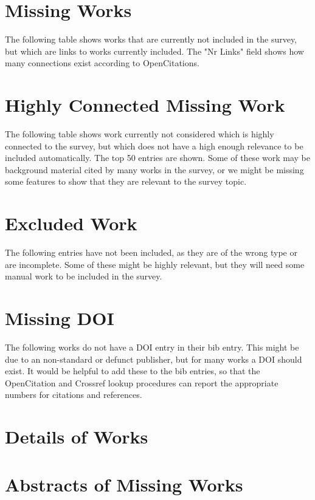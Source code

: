 \documentclass[a4paper]{article}
\begin{document}




\clearpage
\section{Missing Works}

The following table shows works that are currently not included in the survey, but which are links to works currently included. The "Nr Links" field shows how many connections exist according to OpenCitations.



\clearpage
\section{Highly Connected Missing Work}

The following table shows work currently not considered which is highly connected to the survey, but which does not have a high enough relevance to be included automatically. The top 50 entries are shown. Some of these work may be background material cited by many works in the survey, or we might be missing some features to show that they are relevant to the survey topic.



\clearpage
\section{Excluded Work}

The following entries have not been included, as they are of the wrong type or are incomplete. Some of these might be highly relevant, but they will need some manual work to be included in the survey.



\clearpage
\section{Missing DOI}

The following works do not have a DOI entry in their bib entry. This might be due to an non-standard or defunct publisher, but for many works a DOI should exist. It would be helpful to add these to the bib entries, so that the OpenCitation and Crossref lookup procedures can report the appropriate numbers for citations and references.



\clearpage
\section{Details of Works}



\clearpage
\section{Abstracts of Missing Works}





\printindex
\end{document}
